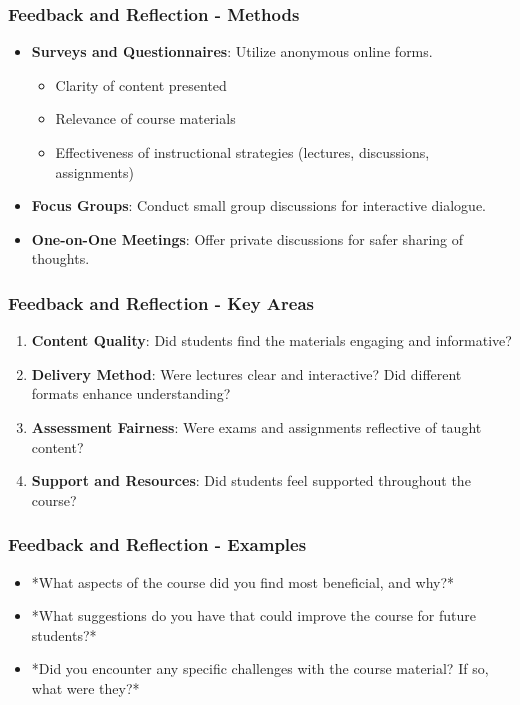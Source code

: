 \documentclass[aspectratio=169]{beamer}
\begin{document}
\begin{frame}[fragile]
    \frametitle{Feedback and Reflection - Methods}
    \begin{itemize}
        \item \textbf{Surveys and Questionnaires}: Utilize anonymous online forms.
        \begin{itemize}
            \item Clarity of content presented
            \item Relevance of course materials 
            \item Effectiveness of instructional strategies (lectures, discussions, assignments)
        \end{itemize}
        
        \item \textbf{Focus Groups}: Conduct small group discussions for interactive dialogue.
        
        \item \textbf{One-on-One Meetings}: Offer private discussions for safer sharing of thoughts.
    \end{itemize}
\end{frame}

\begin{frame}[fragile]
    \frametitle{Feedback and Reflection - Key Areas}
    \begin{enumerate}
        \item \textbf{Content Quality}: Did students find the materials engaging and informative?
        \item \textbf{Delivery Method}: Were lectures clear and interactive? Did different formats enhance understanding?
        \item \textbf{Assessment Fairness}: Were exams and assignments reflective of taught content?
        \item \textbf{Support and Resources}: Did students feel supported throughout the course?
    \end{enumerate}
\end{frame}

\begin{frame}[fragile]
    \frametitle{Feedback and Reflection - Examples}
    \begin{itemize}
        \item *What aspects of the course did you find most beneficial, and why?*
        \item *What suggestions do you have that could improve the course for future students?*
        \item *Did you encounter any specific challenges with the course material? If so, what were they?*
    \end{itemize}
\end{frame}
\end{document}
